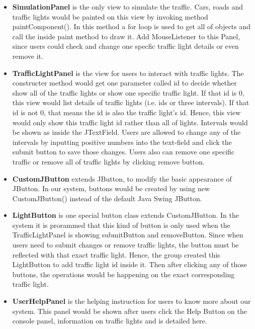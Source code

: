 \documentclass[11pt]{article}
\begin{document}
\begin{itemize}[noitemsep]
\item \textbf{SimulationPanel} is the only view to simulate the traffic. Cars, roads and traffic lights would be painted on this view by invoking method paintComponent(). In this method a for loop is used to get all of objects and call the inside paint method to draw it. Add MouseListener to  this Panel, since users could check and change one specfic traffic light details or even remove it. 
 
\item \textbf{TrafficLightPanel} is the view for users to  interact with traffic lights. The constructer method would get one parameter called id to decide whether show all of the traffic lights or show one specific traffic light. If that id is 0, this view would list details of  traffic lights (i.e. ids or three intervals). If that id is not 0, that means the id is also the traffic light's id. Hence, this view would only show this traffic light id rather than all of lights. Intervals would be shown as inside the JTextField. Users are allowed to change any of the intervals by inputting positive numbers into the text-field and click the submit button to save those changes. Users also can remove one specific traffic or remove all of traffic lights by clicking remove button.  
 
\item \textbf{CustomJButton} extends JButton, to modify the basic appearance of JButton. In our system, buttons would be created by using new CustomJButton() instead of the default Java Swing JButton. 
 
\item \textbf{LightButton} is one special button class extends CustomJButton. In the system it is prorammed that this kind of button is only used when the TrafficLightPanel is showing submitButton and removeButton. Since when users need to submit changes or remove traffic lights, the button must be reflected with that exact traffic light. Hence, the group created this LightButton to add traffic light id inside it. Then after clicking any of those buttons, the operations would be happening on the exact corresponding traffic light. 
 
\item \textbf{UserHelpPanel} is the helping instruction for users to know more about our system. This panel would be shown after users click the Help Button on the console panel, information on traffic lights and  is detailed here. 
\end{itemize}
\end{document}
